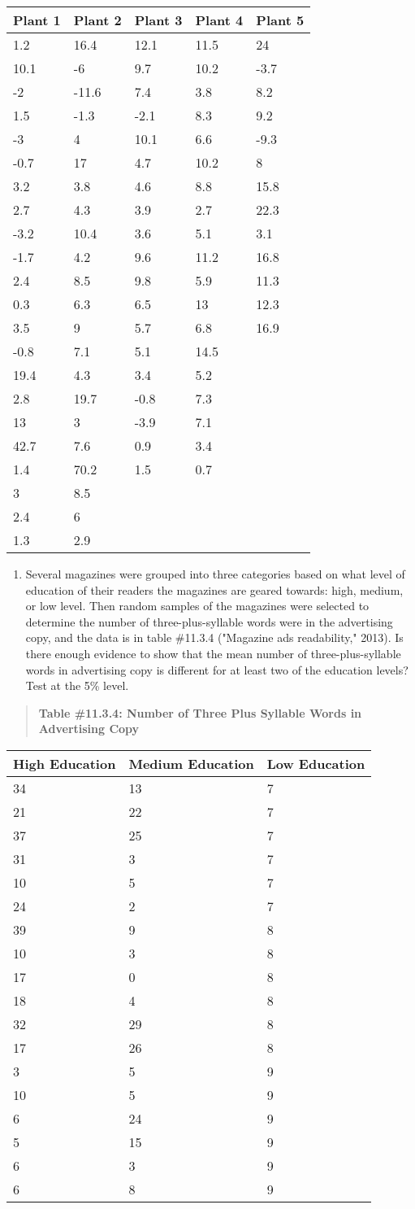 \documentclass[]{book}
\providecommand{\tightlist}{%
  \setlength{\itemsep}{0pt}\setlength{\parskip}{0pt}}
\begin{document}
\begin{longtable}[]{@{}lllll@{}}
\toprule
Plant 1 & Plant 2 & Plant 3 & Plant 4 & Plant 5\tabularnewline
\midrule
\endhead
1.2 & 16.4 & 12.1 & 11.5 & 24\tabularnewline
10.1 & -6 & 9.7 & 10.2 & -3.7\tabularnewline
-2 & -11.6 & 7.4 & 3.8 & 8.2\tabularnewline
1.5 & -1.3 & -2.1 & 8.3 & 9.2\tabularnewline
-3 & 4 & 10.1 & 6.6 & -9.3\tabularnewline
-0.7 & 17 & 4.7 & 10.2 & 8\tabularnewline
3.2 & 3.8 & 4.6 & 8.8 & 15.8\tabularnewline
2.7 & 4.3 & 3.9 & 2.7 & 22.3\tabularnewline
-3.2 & 10.4 & 3.6 & 5.1 & 3.1\tabularnewline
-1.7 & 4.2 & 9.6 & 11.2 & 16.8\tabularnewline
2.4 & 8.5 & 9.8 & 5.9 & 11.3\tabularnewline
0.3 & 6.3 & 6.5 & 13 & 12.3\tabularnewline
3.5 & 9 & 5.7 & 6.8 & 16.9\tabularnewline
-0.8 & 7.1 & 5.1 & 14.5 &\tabularnewline
19.4 & 4.3 & 3.4 & 5.2 &\tabularnewline
2.8 & 19.7 & -0.8 & 7.3 &\tabularnewline
13 & 3 & -3.9 & 7.1 &\tabularnewline
42.7 & 7.6 & 0.9 & 3.4 &\tabularnewline
1.4 & 70.2 & 1.5 & 0.7 &\tabularnewline
3 & 8.5 & & &\tabularnewline
2.4 & 6 & & &\tabularnewline
1.3 & 2.9 & & &\tabularnewline
\bottomrule
\end{longtable}

\begin{enumerate}
\def\labelenumi{\arabic{enumi}.}
\setcounter{enumi}{2}
\tightlist
\item
  Several magazines were grouped into three categories based on what level of education of their readers the magazines are geared towards: high, medium, or low level. Then random samples of the magazines were selected to determine the number of three-plus-syllable words were in the advertising copy, and the data is in table \#11.3.4 ("Magazine ads readability," 2013). Is there enough evidence to show that the mean number of three-plus-syllable words in advertising copy is different for at least two of the education levels? Test at the 5\% level.
\end{enumerate}

\begin{quote}
\textbf{Table \#11.3.4: Number of Three Plus Syllable Words in Advertising
Copy}
\end{quote}

\begin{longtable}[]{@{}lll@{}}
\toprule
High Education & Medium Education & Low Education\tabularnewline
\midrule
\endhead
34 & 13 & 7\tabularnewline
21 & 22 & 7\tabularnewline
37 & 25 & 7\tabularnewline
31 & 3 & 7\tabularnewline
10 & 5 & 7\tabularnewline
24 & 2 & 7\tabularnewline
39 & 9 & 8\tabularnewline
10 & 3 & 8\tabularnewline
17 & 0 & 8\tabularnewline
18 & 4 & 8\tabularnewline
32 & 29 & 8\tabularnewline
17 & 26 & 8\tabularnewline
3 & 5 & 9\tabularnewline
10 & 5 & 9\tabularnewline
6 & 24 & 9\tabularnewline
5 & 15 & 9\tabularnewline
6 & 3 & 9\tabularnewline
6 & 8 & 9\tabularnewline
\bottomrule
\end{longtable}
\end{document}
